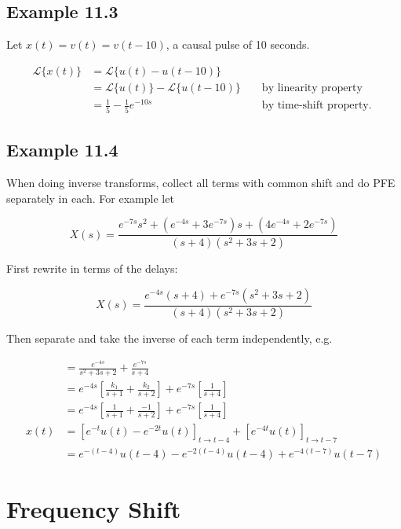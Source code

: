 \documentclass{article}
\begin{document}
\subsection{Example 11.3}

Let $x(t)=v(t)=v(t-10)$, a causal pulse of 10 seconds.

$$
\begin{aligned}
\mathcal{L}\{x(t)\} & =\mathcal{L}\{u(t)-u(t-10)\} & & \\
& =\mathcal{L}\{u(t)\}-\mathcal{L}\{u(t-10)\} & & \text { by linearity property } \\
& =\frac{1}{5}-\frac{1}{5} e^{-10s} & & \text { by time-shift property. }
\end{aligned}
$$


\subsection{Example 11.4}

When doing inverse transforms, collect all terms with common shift and do PFE separately in each. For example let

\[
X(s)=\frac{e^{-7 s} s^2 + \left(e^{-4s} + 3e^{-7s}\right)s + \left(4e^{-4s} + 2e^{-7s} \right)}{(s+4)\left(s^{2}+3 s+2\right)}
\]

First rewrite in terms of the delays:

\[
X(s)=\frac{e^{-4 s}(s+4)+e^{-7 s}\left(s^{2}+3s+2\right)}{(s+4)\left(s^{2}+3 s+2\right)}
\]

Then separate and take the inverse of each term independently, e.g.

$$
\begin{aligned}
& =\frac{e^{-4 s}}{s^{2}+3s+2}+\frac{e^{-7 s}}{s+4} \\
& =e^{-4 s}\left[\frac{k_{1}}{s+1}+\frac{k_{2}}{s+2}\right]+e^{-7 s}\left[\frac{1}{s+4}\right] \\
& =e^{-4 s}\left[\frac{1}{s+1}+\frac{-1}{s+2}\right]+e^{-7 s}\left[\frac{1}{s+4}\right] \\
x(t) & =\left[e^{-t} u(t)-e^{-2 t} u(t)\right]_{t\rightarrow t-4} + \left[e^{-4 t} u(t)\right]_{t\rightarrow t-7} \\
& =e^{-(t-4)} u(t-4)-e^{-2(t-4)} u(t-4)+e^{-4(t-7)} u(t-7)
\end{aligned}
$$

\section{Frequency Shift}
\end{document}
